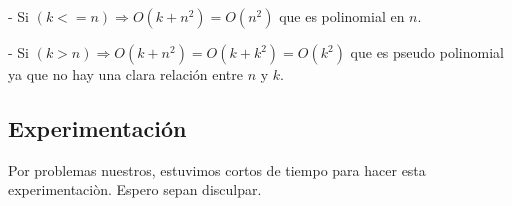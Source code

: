 - Si $(k <= n) \Rightarrow O(k + n^2) = O(n^2)$ que es polinomial en $n$.

- Si $(k > n) \Rightarrow O(k + n^2) = O(k + k^2) = O(k^2)$ que es pseudo polinomial ya que no hay una clara relación entre $n$ y $k$.

\subsection{Experimentación}

Por problemas nuestros, estuvimos cortos de tiempo para hacer esta experimentaciòn. Espero sepan disculpar.
